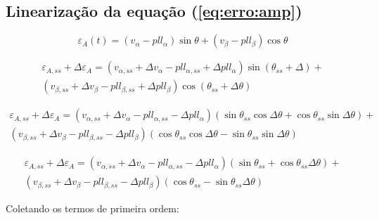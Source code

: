 \documentclass[12pt,a4paper]{report}
\begin{document}
\subsection{Linearização da equação (\ref{eq:erro:amp})}

\begin{equation}
\varepsilon_A(t)=
\left(
v_\alpha - pll_\alpha
\right)
\sin \theta +
\left(
v_\beta - pll_\beta
\right)
\cos \theta
\end{equation}


\begin{multline}
\varepsilon_{A,ss} + \Delta\varepsilon_A =
\left(
v_{\alpha,ss} + \Delta v_\alpha - 
pll_{\alpha,ss} + \Delta pll_\alpha
\right)
\sin (\theta_{ss} + \Delta)+\\
\left(
v_{\beta,ss} + \Delta v_\beta - 
pll_{\beta,ss} + \Delta pll_\beta
\right)
\cos (\theta_{ss} + \Delta \theta)
\end{multline}



\begin{multline}
\varepsilon_{A,ss} + \Delta\varepsilon_A =
\left(
v_{\alpha,ss} + \Delta v_\alpha - 
pll_{\alpha,ss} - \Delta pll_\alpha
\right)
\left(
\sin \theta_{ss} \cos \Delta \theta +
\cos \theta_{ss} \sin \Delta \theta
\right)+\\
\left(
v_{\beta,ss} + \Delta v_\beta - 
pll_{\beta,ss} - \Delta pll_\beta
\right)
\left(
\cos \theta_{ss} \cos \Delta \theta -
\sin \theta_{ss} \sin \Delta \theta
\right)
\end{multline}





\begin{multline}
\varepsilon_{A,ss} + \Delta\varepsilon_A =
\left(
v_{\alpha,ss} + \Delta v_\alpha - 
pll_{\alpha,ss} - \Delta pll_\alpha
\right)
\left(
\sin \theta_{ss} +
\cos \theta_{ss} \Delta \theta
\right)+\\
\left(
v_{\beta,ss} + \Delta v_\beta - 
pll_{\beta,ss} - \Delta pll_\beta
\right)
\left(
\cos \theta_{ss} -
\sin \theta_{ss}  \Delta \theta
\right)
\end{multline}



Coletando os termos de primeira ordem:
\end{document}
